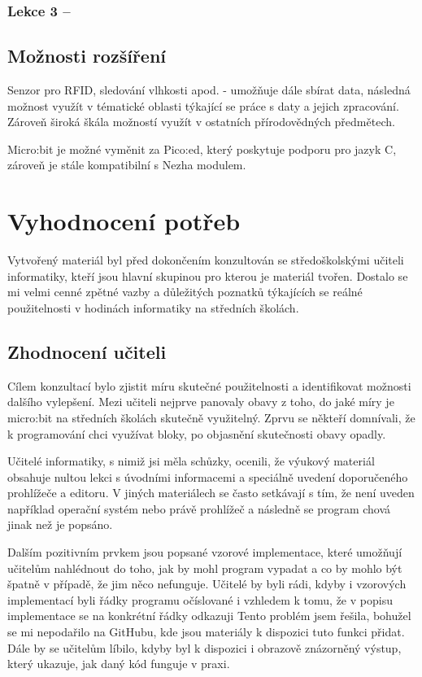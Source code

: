 \documentclass[
  digital,     %
  oneside,     %
  nosansbold,  %
  colorbold, %
  lof,         %
  nolot,         %
]{fithesis4}
\begin{document}
\subsection{Lekce 3 -- }

\section{Možnosti rozšíření}
Senzor pro RFID, sledování vlhkosti apod. - umožňuje dále sbírat data, následná možnost využít v tématické oblasti týkající se práce s daty a jejich zpracování. Zároveň široká škála možností využít v ostatních přírodovědných předmětech.

Micro:bit je možné vyměnit za Pico:ed, který poskytuje podporu pro jazyk C, zároveň je stále kompatibilní s Nezha modulem. 

\chapter{Vyhodnocení potřeb}
Vytvořený materiál byl před dokončením konzultován se středoškolskými učiteli informatiky, kteří jsou hlavní  skupinou pro kterou je materiál tvořen. Dostalo se mi velmi cenné zpětné vazby a důležitých poznatků týkajících se reálné použitelnosti v hodinách informatiky na středních školách.

\section{Zhodnocení učiteli}
Cílem konzultací bylo zjistit míru skutečné použitelnosti a identifikovat možnosti dalšího vylepšení. Mezi učiteli nejprve panovaly obavy z toho, do jaké míry je micro:bit na středních školách skutečně využitelný. Zprvu se někteří domnívali, že k programování chci využívat bloky, po objasnění skutečnosti obavy opadly.

Učitelé informatiky, s nimiž jsi měla schůzky, ocenili, že výukový materiál obsahuje nultou lekci s úvodními informacemi a speciálně uvedení doporučeného prohlížeče a editoru. V jiných materiálech se často setkávají s tím, že není uveden například operační systém nebo právě prohlížeč a následně se program chová jinak než je popsáno. 

Dalším pozitivním prvkem jsou popsané vzorové implementace, které umožňují učitelům nahlédnout do toho, jak by mohl program vypadat a co by mohlo být špatně v případě, že jim něco nefunguje. Učitelé by byli rádi, kdyby i vzorových implementací byli řádky programu očíslované i vzhledem k tomu, že v popisu implementace se na konkrétní řádky odkazuji Tento problém jsem řešila, bohužel se mi nepodařilo na GitHubu, kde jsou materiály k dispozici tuto funkci přidat. Dále by se učitelům líbilo, kdyby byl k dispozici i obrazově znázorněný výstup, který ukazuje, jak daný kód funguje v praxi.
\end{document}
